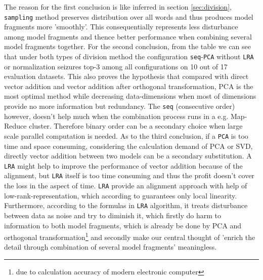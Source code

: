 The reason for the first conclusion is like inferred in section \ref{sec:division}, \verb|sampling| method preserves distribution over all words and thus produces model fragments more 'smoothly'. This consequentially represents less disturbance among model fragments and thence better performance when combining several model fragments together. For the second conclusion, from the table we can see that under both types of division method the configuration \verb|seq|-\verb|PCA| without \verb|LRA| or normalization seizures top-3 among all configurations on 10 out of 17 evaluation datasets. This also proves the hypothesis that compared with direct vector addition and vector addition after orthogonal transformation, PCA is the most optimal method while decreasing data-dimensions when most of dimensions provide no more information but redundancy. The \verb|seq| (consecutive order) however, doesn't help much when the combination process runs in a e.g. Map-Reduce cluster. Therefore binary order can be a secondary choice when large scale parallel computation is needed. As to the third conclusion, if a \verb|PCA| is too time and space consuming, considering the calculation demand of PCA or SVD, directly vector addition between two models can be a secondary substitution. A \verb|LRA| might help to improve the performance of vector addition because of the alignment, but \verb|LRA| itself is too time consuming and thus the profit doesn't cover the loss in the aspect of time. \verb|LRA| provide an alignment approach with help of low-rank-representation, which according to \cite{boucher2015aligning} guarantees only local linearity. Furthermore, according to the formulas in \verb|LRA| algorithm, it treats disturbance between data as noise and try to diminish it, which firstly do harm to information to both model fragments, which is already be done by PCA and orthogonal transformation\footnote{due to calculation accuracy of modern electronic computer} and secondly make our central thought of 'enrich the detail through combination of several model fragments' meaningless.